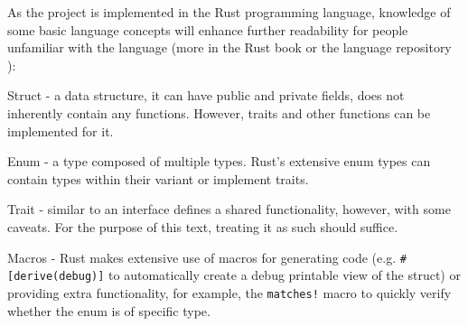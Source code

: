 \begin{enumerate}
    As the project is implemented in the Rust programming language, knowledge of some basic language concepts will enhance further readability for people unfamiliar with the language (more in the Rust book \cite{klabnik_rust_2023} or the language repository \cite{rust_foundation_rust-langrust_2024}):

    \subitem Struct - a data structure, it can have public and private fields, does not inherently contain any functions. However, traits and other functions can be implemented for it.

    \subitem Enum - a type composed of multiple types. Rust's extensive enum types can contain types within their variant or implement traits.

    \subitem Trait - similar to an interface defines a shared functionality, however, with some caveats. For the purpose of this text, treating it as such should suffice.

    \subitem Macros - Rust makes extensive use of macros for generating code (e.g. \verb|#[derive(debug)]| to automatically create a debug printable view of the struct) or providing extra functionality, for example, the \verb|matches!| macro to quickly verify whether the enum is of specific type.
\end{enumerate}